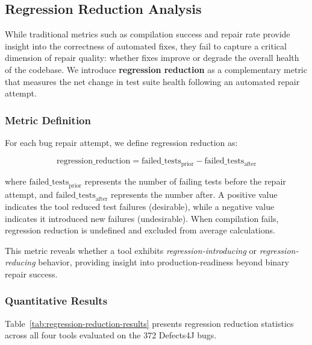 \subsection{Regression Reduction Analysis}
\label{subsec:regression-reduction}

While traditional metrics such as compilation success and repair rate provide insight into the correctness of automated fixes, they fail to capture a critical dimension of repair quality: whether fixes improve or degrade the overall health of the codebase. We introduce \textbf{regression reduction} as a complementary metric that measures the net change in test suite health following an automated repair attempt.

\subsubsection{Metric Definition}

For each bug repair attempt, we define regression reduction as:

\begin{equation}
\text{regression\_reduction} = \text{failed\_tests}_{\text{prior}} - \text{failed\_tests}_{\text{after}}
\label{eq:regression-reduction}
\end{equation}

where $\text{failed\_tests}_{\text{prior}}$ represents the number of failing tests before the repair attempt, and $\text{failed\_tests}_{\text{after}}$ represents the number after. A positive value indicates the tool reduced test failures (desirable), while a negative value indicates it introduced new failures (undesirable). When compilation fails, regression reduction is undefined and excluded from average calculations.

This metric reveals whether a tool exhibits \textit{regression-introducing} or \textit{regression-reducing} behavior, providing insight into production-readiness beyond binary repair success.

\subsubsection{Quantitative Results}

Table~\ref{tab:regression-reduction-results} presents regression reduction statistics across all four tools evaluated on the 372 Defects4J bugs.

